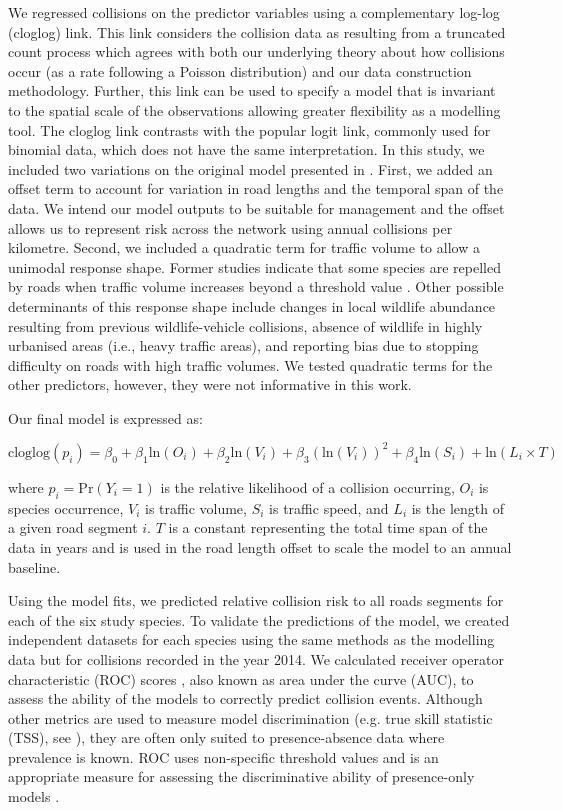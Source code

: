 We regressed collisions on the predictor variables using a complementary log-log (cloglog) link.  This link considers the collision data as resulting from a truncated count process which agrees with both our underlying theory about how collisions occur (as a rate following a Poisson distribution) and our data construction methodology. Further, this link can be used to specify a model that is invariant to the spatial scale of the observations allowing greater flexibility as a modelling tool. The cloglog link contrasts with the popular logit link, commonly used for binomial data, which does not have the same interpretation. In this study, we included two variations on the original model presented in . First, we added an offset term to account for variation in road lengths and the temporal span of the data. We intend our model outputs to be suitable for management and the offset allows us to represent risk across the network using annual collisions per kilometre. Second, we included a quadratic term for traffic volume to allow a unimodal response shape. Former studies indicate that some species are repelled by roads when traffic volume increases beyond a threshold value \citep{seil05,gagn07}. Other possible determinants of this response shape include changes in local wildlife abundance resulting from previous wildlife-vehicle collisions, absence of wildlife in highly urbanised areas (i.e., heavy traffic areas), and reporting bias due to stopping difficulty on roads with high traffic volumes. We tested quadratic terms for the other predictors, however, they were not informative in this work.

Our final model is expressed as: 

\begin{equation}
\text{cloglog}(p_i) = \beta_0 + \beta_1 \text{ln}(O_i) + \beta_2 \text{ln}(V_i) + \beta_3 (\text{ln}(V_i))^2 + \beta_4 \text{ln}(S_i) + \text{ln}(L_i \times T)
\end{equation}

\noindent where $p_i=\text{Pr}(Y_i=1)$ is the relative likelihood of a collision occurring, $O_i$ is species occurrence, $V_i$ is traffic volume, $S_i$ is traffic speed, and $L_i$ is the length of a given road segment $i$. $T$ is a constant representing the total time span of the data in years and is used in the road length offset to scale the model to an annual baseline.

Using the model fits, we predicted relative collision risk to all roads segments for each of the six study species.  To validate the predictions of the model, we created independent datasets for each species using the same methods as the modelling data but for collisions recorded in the year 2014.  We calculated receiver operator characteristic (ROC) scores \citep{metz78}, also known as area under the curve (AUC), to assess the ability of the models to correctly predict collision events. Although other metrics are used to measure model discrimination (e.g. true skill statistic (TSS), see \cite{allo06}), they are often only suited to presence-absence data where prevalence is known. ROC uses non-specific threshold values and is an appropriate measure for assessing the discriminative ability of presence-only models \citep{laws14}. 

